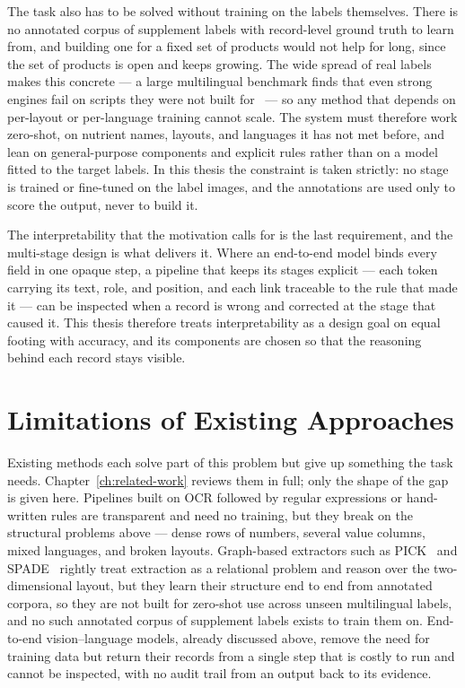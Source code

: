 The task also has to be solved without training on the labels themselves. There
is no annotated corpus of supplement labels with record-level ground truth to
learn from, and building one for a fixed set of products would not help for long,
since the set of products is open and keeps growing. The wide spread of real
labels makes this concrete --- a large multilingual benchmark finds that even
strong engines fail on scripts they were not built for~\cite{arief2026halalbench}
--- so any method that depends on per-layout or per-language training cannot
scale. The system must therefore work zero-shot, on nutrient names, layouts, and
languages it has not met before, and lean on general-purpose components and
explicit rules rather than on a model fitted to the target labels. In this thesis
the constraint is taken strictly: no stage is trained or fine-tuned on the label
images, and the annotations are used only to score the output, never to build it.

The interpretability that the motivation calls for is the last requirement, and
the multi-stage design is what delivers it. Where an end-to-end model binds every
field in one opaque step, a pipeline that keeps its stages explicit --- each token
carrying its text, role, and position, and each link traceable to the rule that
made it --- can be inspected when a record is wrong and corrected at the stage
that caused it. This thesis therefore treats interpretability as a design goal on
equal footing with accuracy, and its components are chosen so that the reasoning
behind each record stays visible.

\section{Limitations of Existing Approaches}\label{sec:intro-gap}

Existing methods each solve part of this problem but give up something the task
needs. Chapter~\ref{ch:related-work} reviews them in full; only the shape of the
gap is given here. Pipelines built on OCR followed by regular expressions or
hand-written rules are transparent and need no training, but they break on the
structural problems above --- dense rows of numbers, several value columns, mixed
languages, and broken layouts. Graph-based extractors such as PICK~\cite{yu2020pick}
and SPADE~\cite{hwang2021spade} rightly treat extraction as a relational problem
and reason over the two-dimensional layout, but they learn their structure end to
end from annotated corpora, so they are not built for zero-shot use across unseen
multilingual labels, and no such annotated corpus of supplement labels exists to
train them on. End-to-end vision--language models, already discussed above, remove
the need for training data but return their records from a single step that is
costly to run and cannot be inspected, with no audit trail from an output back to
its evidence.

